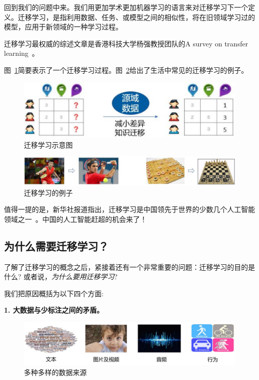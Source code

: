 回到我们的问题中来。我们用更加学术更加机器学习的语言来对迁移学习下一个定义。迁移学习，是指利用数据、任务、或模型之间的相似性，将在旧领域学习过的模型，应用于新领域的一种学习过程。

迁移学习最权威的综述文章是香港科技大学杨强教授团队的A survey on transfer learning~\cite{pan2010survey}。

图~\ref{fig-transfer}简要表示了一个迁移学习过程。图~\ref{fig-example}给出了生活中常见的迁移学习的例子。

\begin{figure}[htbp]
	\centering
	\includegraphics[scale=0.5]{./figures/fig-introduction-transfer.pdf}
	\caption{迁移学习示意图}
	\label{fig-transfer}
\end{figure}

\begin{figure}[htbp]
	\centering
	\includegraphics[scale=0.5]{./figures/fig-introduction-example.pdf}
	\caption{迁移学习的例子}
	\label{fig-example}
\end{figure}

值得一提的是，新华社报道指出，迁移学习是中国领先于世界的少数几个人工智能领域之一~\cite{xinhua}。中国的人工智能赶超的机会来了！


\subsection{为什么需要迁移学习？}

了解了迁移学习的概念之后，紧接着还有一个非常重要的问题：迁移学习的目的是什么? 或者说，\textit{为什么要用迁移学习}?

我们把原因概括为以下四个方面:

\textbf{1. 大数据与少标注之间的矛盾。}

\begin{figure}[htbp]
	\centering
	\includegraphics[scale=0.42]{./figures/fig-introduction-data.pdf}
	\caption{多种多样的数据来源}
	\label{fig-introduction-data}
\end{figure}

